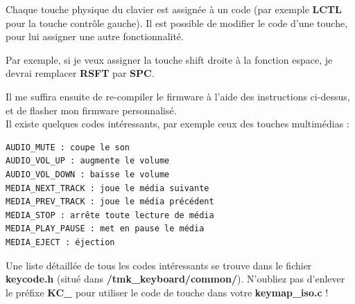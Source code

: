 \documentclass[12pt,a4paper,final]{article}
\begin{document}
\FloatBarrier

Chaque touche physique du clavier est assignée à un code (par exemple \textbf{LCTL} pour la touche contrôle gauche). Il est possible de modifier le code d'une touche, pour lui assigner une autre fonctionnalité.

Par exemple, si je veux assigner la touche shift droite à la fonction espace, je devrai remplacer \textbf{RSFT} par \textbf{SPC}.

Il me suffira ensuite de re-compiler le firmware à l'aide des instructions ci-dessus, et de flasher mon firmware personnalisé.
\\[12pt]

Il existe quelques codes intéressants, par exemple ceux des touches multimédias :

\begin{verbatim}
AUDIO_MUTE : coupe le son
AUDIO_VOL_UP : augmente le volume
AUDIO_VOL_DOWN : baisse le volume
MEDIA_NEXT_TRACK : joue le média suivante
MEDIA_PREV_TRACK : joue le média précédent
MEDIA_STOP : arrête toute lecture de média
MEDIA_PLAY_PAUSE : met en pause le média
MEDIA_EJECT : éjection
\end{verbatim}

Une liste détaillée de tous les codes intéressants se trouve dans le fichier \textbf{keycode.h} (situé dans \textbf{/tmk\_keyboard/common/}). N'oubliez pas d'enlever le préfixe \textbf{KC\_} pour utiliser le code de touche dans votre \textbf{keymap\_iso.c} !
\end{document}
